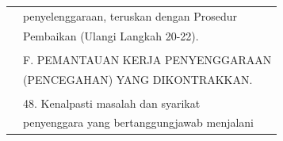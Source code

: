\documentclass[
]{article}
\begin{document}
\begin{longtable}[]{@{}ll@{}}
\begin{minipage}[t]{0.23\columnwidth}
\strut
\end{minipage} & \begin{minipage}[t]{0.71\columnwidth}\raggedright
penyelenggaraan, teruskan dengan Prosedur\strut
\end{minipage}\tabularnewline
\begin{minipage}[t]{0.23\columnwidth}\raggedright
\strut
\end{minipage} & \begin{minipage}[t]{0.71\columnwidth}\raggedright
Pembaikan (Ulangi Langkah 20-22).\strut
\end{minipage}\tabularnewline
\begin{minipage}[t]{0.23\columnwidth}\raggedright
\strut
\end{minipage} & \begin{minipage}[t]{0.71\columnwidth}\raggedright
\strut
\end{minipage}\tabularnewline
\begin{minipage}[t]{0.23\columnwidth}\raggedright
\strut
\end{minipage} & \begin{minipage}[t]{0.71\columnwidth}\raggedright
F. PEMANTAUAN KERJA PENYENGGARAAN\strut
\end{minipage}\tabularnewline
\begin{minipage}[t]{0.23\columnwidth}\raggedright
\strut
\end{minipage} & \begin{minipage}[t]{0.71\columnwidth}\raggedright
(PENCEGAHAN) YANG DIKONTRAKKAN.\strut
\end{minipage}\tabularnewline
\begin{minipage}[t]{0.23\columnwidth}\raggedright
\strut
\end{minipage} & \begin{minipage}[t]{0.71\columnwidth}\raggedright
\strut
\end{minipage}\tabularnewline
\begin{minipage}[t]{0.23\columnwidth}\raggedright
\strut
\end{minipage} & \begin{minipage}[t]{0.71\columnwidth}\raggedright
48. Kenalpasti masalah dan syarikat\strut
\end{minipage}\tabularnewline
\begin{minipage}[t]{0.23\columnwidth}\raggedright
\strut
\end{minipage} & \begin{minipage}[t]{0.71\columnwidth}\raggedright
penyenggara yang bertanggungjawab menjalani\strut

\end{minipage}
\end{longtable}
\end{document}
